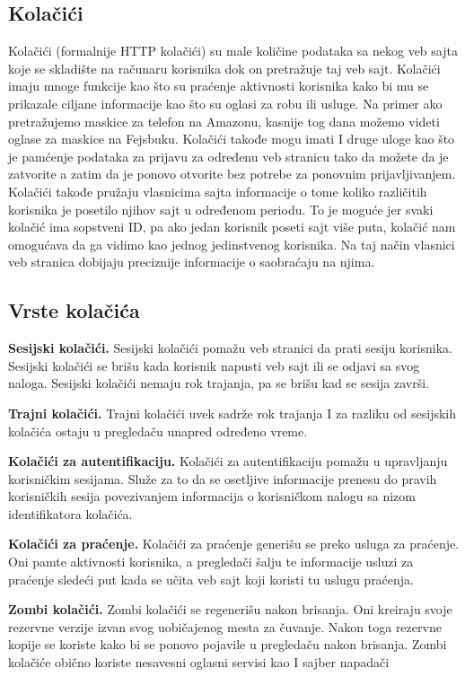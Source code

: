 \documentclass[a4paper]{article}
\begin{document}
	\subsection{Kolačići}
	\label{subsec:kolacici}
	Kolačići (formalnije HTTP kolačići) su male količine podataka sa nekog veb sajta koje se skladište na računaru korisnika dok on pretražuje taj veb sajt. Kolačići imaju mnoge funkcije kao što su praćenje aktivnosti korisnika kako bi mu se prikazale ciljane informacije kao što su oglasi za robu ili usluge. Na primer ako pretražujemo maskice za telefon na Amazonu, kasnije tog dana možemo videti oglase za maskice na Fejsbuku. Kolačići takođe mogu imati I druge uloge kao što je pamćenje podataka za prijavu za određenu veb stranicu tako da možete da je zatvorite a zatim da je ponovo otvorite bez potrebe za ponovnim prijavljivanjem. Kolačići takođe pružaju vlasnicima sajta informacije o tome koliko različitih korisnika je posetilo njihov sajt u određenom periodu. To je moguće jer svaki kolačić ima sopstveni ID, pa ako jedan korisnik poseti sajt više puta, kolačić nam omogućava da ga vidimo kao jednog jedinstvenog korisnika. Na taj način vlasnici veb stranica dobijaju preciznije informacije o saobraćaju na njima.
	
	\subsection{Vrste kolačića}
	\label{subsec:vrstekolacica}
	\textbf{Sesijski kolačići.} Sesijski kolačići pomažu veb stranici da prati sesiju korisnika. Sesijski kolačići se brišu kada korisnik napusti veb sajt ili se odjavi sa svog naloga. Sesijski kolačići nemaju rok trajanja, pa se brišu kad se sesija završi. 
	
	\textbf{Trajni kolačići.} Trajni kolačići uvek sadrže rok trajanja I za razliku od sesijskih kolačića ostaju u pregledaču unapred određeno vreme. 
	
	\textbf{Kolačići za autentifikaciju.} Kolačići za autentifikaciju pomažu u upravljanju korisničkim sesijama. Služe za to da se osetljive informacije prenesu do pravih korisničkih sesija povezivanjem informacija o korisničkom nalogu sa nizom identifikatora kolačića. 
	
	\textbf{Kolačići za praćenje.} Kolačići za praćenje generišu se preko usluga za praćenje. Oni pamte aktivnosti korisnika, a pregledači šalju te informacije usluzi za praćenje sledeći put kada se učita veb sajt koji koristi tu uslugu praćenja. 
	
	\textbf{Zombi kolačići.} Zombi kolačići se regenerišu nakon brisanja. Oni kreiraju svoje rezervne verzije izvan svog uobičajenog mesta za čuvanje. Nakon toga rezervne kopije se koriste kako bi se ponovo pojavile u pregledaču nakon brisanja. Zombi kolačiće obično koriste nesavesni oglasni servisi kao I sajber napadači 
	
\end{document}
